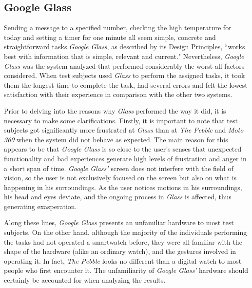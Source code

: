 \documentclass[11pt,a4paper]{scrartcl}
\begin{document}
\subsection{Google Glass}
Sending a message to a specified number, checking the high temperature for today and setting a timer for one minute all seem simple, concrete and straightforward tasks.\textit{Google Glass}, as described by its Design Principles, ``works best with information that is simple, relevant and current."\cite{google01}  Nevertheless, \textit{Google Glass} was the system analyzed that performed considerably the worst all factors considered. When test subjects used \textit{Glass} to perform the assigned tasks, it took them the longest time to complete the task, had several errors and felt the lowest satisfaction with their experience in comparison with the other two systems.

Prior to delving into the reasons why \textit{Glass} performed the way it did, it is necessary to make some clarifications. Firstly, it is important to note that test subjects got significantly more frustrated at \textit{Glass} than at \textit{The Pebble} and \textit{Moto 360} when the system did not behave as expected. The main reason for this appears to be that \textit{Google Glass} is so close to the user's senses that unexpected functionality and bad experiences generate high levels of frustration and anger in a short span of time. \textit{Google Glass'} screen does not interfere with the field of vision, so the user is not exclusively focused on the screen but also on what is happening in his surroundings. As the user notices motions in his surroundings, his head and eyes deviate, and the ongoing process in \textit{Glass} is affected, thus generating exasperation.

Along these lines, \textit{Google Glass} presents an unfamiliar hardware to most test subjects. On the other hand, although the majority of the individuals performing the tasks had not operated a smartwatch before, they were all familiar with the shape of the hardware (alike an ordinary watch), and the gestures involved in operating it. In fact, \textit{The Pebble} looks no different than a digital watch to most people who first encounter it. The unfamiliarity of \textit{Google Glass'} hardware should certainly be accounted for when analyzing the results.
\end{document}
